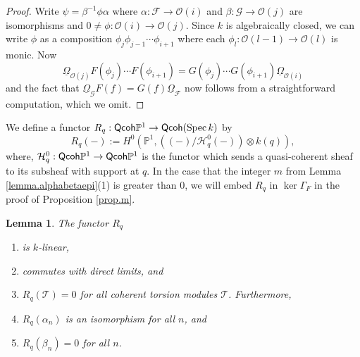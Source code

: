 \documentclass[10pt]{amsart}
\newtheorem{lemma}{Lemma}[section]
\theoremstyle{definition}
\theoremstyle{remark}
\numberwithin{equation}{section}
\begin{document}
\begin{proof}
Write $\psi = \beta^{-1} \phi \alpha$ where $\alpha: \mathcal{F}
\rightarrow \mathcal{O}(i)$ and $\beta: \mathcal{G} \rightarrow
\mathcal{O}(j)$ are isomorphisms and $0 \neq \phi: \mathcal{O}(i)
\rightarrow \mathcal{O}(j)$.  Since $k$ is algebraically closed, we can write $\phi$ as a composition $\phi_{j}\phi_{j-1}
\cdots \phi_{i+1}$ where each $\phi_{l}:\mathcal{O}(l-1)
\rightarrow \mathcal{O}(l)$ is monic.  Now
$$
\underline{\Omega}_{\mathcal{O}(j)}  F(\phi_{j})
\cdots  F(\phi_{i+1}) = G (\phi_{j})  \cdots  G (
\phi_{i+1})  \underline{\Omega}_{\mathcal{O}(i)}
$$
and the fact that $\underline{\Omega}_{\mathcal{G}}  F(f)=G(f)  \underline{\Omega}_{\mathcal{F}}$ now follows from a straightforward computation, which we omit.
\end{proof}

We define a functor $R_{q}: {\sf Qcoh }\mathbb{P}^{1} \rightarrow {\sf Qcoh }(\operatorname{Spec }k)$ by
$$
R_{q}(-) := H^{0}(\mathbb{P}^{1},((-)/\mathcal{H}_{q}^{0}(-)) \otimes k(q)),
$$
where, $\mathcal{H}_{q}^{0}:{\sf Qcoh }\mathbb{P}^{1} \rightarrow {\sf Qcoh }\mathbb{P}^{1}$ is the functor which sends a quasi-coherent sheaf to its subsheaf with support at $q$.  In the case that the integer $m$ from Lemma \ref{lemma.alphabetaepi}(1) is greater than $0$, we will embed $R_{q}$ in ${\operatorname{ker }\Gamma_{F}}$ in the proof of Proposition \ref{prop.m}.

\begin{lemma} \label{lemma.k1}
The functor $R_{q}$
\begin{enumerate}
\item is $k$-linear,

\item commutes with direct limits, and

\item $R_{q}(\mathcal{T})=0$ for all coherent torsion modules $\mathcal{T}$.  Furthermore,

\item $R_{q}(\alpha_{n})$ is an isomorphism for all $n$, and

\item $R_{q}(\beta_{n})=0$ for all $n$.
\end{enumerate}
\end{lemma}
\end{document}
